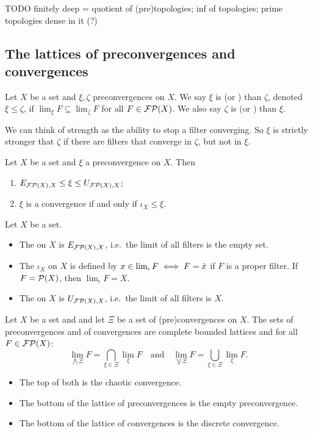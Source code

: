 TODO finitely deep = quotient of (pre)topologies; inf of topologies; prime topologies dense in it (?)

\subsection{The lattices of preconvergences and convergences}
\begin{definition}
Let $X$ be a set and $\xi,\zeta$ preconvergences on $X$. We say $\xi$ is  (or ) than $\zeta$, denoted $\xi \leq \zeta$, if $\lim_\xi F \subseteq \lim_\zeta F$ for all $F\in\operatorname{\mathcal{FP}}(X)$. We also say $\zeta$ is  (or ) than $\xi$.
\end{definition}
We can think of strength as the ability to stop a filter converging. So $\xi$ is strictly stronger that $\zeta$ if there are filters that converge in $\zeta$, but not in $\xi$. 

\begin{lemma}
Let $X$ be a set and $\xi$ a preconvergence on $X$. Then
\begin{enumerate}
\item $E_{\operatorname{\mathcal{FP}}(X), X} \leq \xi \leq U_{\operatorname{\mathcal{FP}}(X), X}$;
\item $\xi$ is a convergence \textup{if and only if} $\iota_X \leq \xi$.
\end{enumerate}
\end{lemma}

\begin{definition}
Let $X$ be a set.
\begin{itemize}
\item The  on $X$ is $E_{\operatorname{\mathcal{FP}}(X), X}$, i.e.\ the limit of all filters is the empty set.
\item The  $\iota_X$ on $X$ is defined by $x \in \lim_\iota F \iff F = \dot{x}$ if $F$ is a proper filter. If $F = \operatorname{\mathcal{P}}(X)$, then $\lim_\iota F = X$.
\item The  on $X$ is $U_{\operatorname{\mathcal{FP}}(X), X}$, i.e.\ the limit of all filters is $X$.
\end{itemize}
\end{definition}

\begin{proposition} \label{latticeConvergences}
Let $X$ be a set and and let $\Xi$ be a set of (pre)convergences on $X$. The sets of preconvergences and of convergences are complete bounded lattices and for all $F \in \operatorname{\mathcal{FP}}(X)$:
\[ \lim_{\bigwedge \Xi} F = \bigcap_{\xi\in\Xi}\lim_\xi F \quad\text{and}\quad \lim_{\bigvee \Xi} F = \bigcup_{\xi\in\Xi}\lim_\xi F. \]
\begin{itemize}
\item The top of both is the chaotic convergence.
\item The bottom of the lattice of preconvergences is the empty preconvergence.
\item The bottom of the lattice of convergences is the discrete convergence.
\end{itemize}
\end{proposition}


